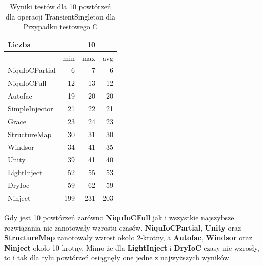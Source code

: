 \documentclass[12pt]{article}
\begin{document}
\begin{table}[H]
\captionsetup{belowskip=0pt,aboveskip=0pt}
\begin{center}
\begin{small}
	\begin{tabular}{ | l | r r r | }
    		\hline
Liczba & & 10 & \\ \hline
 & min & max & avg \\ \hline
NiquIoCPartial & 6 & 7 & 6 \\ \hline
NiquIoCFull & 12 & 13 & 12 \\ \hline
Autofac & 19 & 20 & 20 \\ \hline
SimpleInjector & 21 & 22 & 21 \\ \hline
Grace & 23 & 24 & 23 \\ \hline
StructureMap & 30 & 31 & 30 \\ \hline
Windsor & 34 & 41 & 35 \\ \hline
Unity & 39 & 41 & 40 \\ \hline
LightInject & 52 & 55 & 53 \\ \hline
DryIoc & 59 & 62 & 59 \\ \hline
Ninject & 199 & 231 & 203 \\ \hline
  	\end{tabular}
\end{small}
\end{center}
\caption{Wyniki testów dla 10 powtórzeń dla operacji TransientSingleton dla Przypadku testowego C}
\label{TestCaseC_TransientSingleton10}
\end{table}
Gdy jest 10 powtórzeń zarówno \textbf{NiquIoCFull} jak i wszystkie najszybsze rozwiązania nie zanotowały wzrostu czasów. \textbf{NiquIoCPartial}, \textbf{Unity} oraz \textbf{StructureMap} zanotowały wzrost około 2-krotny, a \textbf{Autofac}, \textbf{Windsor} oraz \textbf{Ninject} około 10-krotny. Mimo że dla \textbf{LightInject} i \textbf{DryIoC} czasy nie wzrosły, to i tak dla tylu powtórzeń osiągnęły one jedne z najwyższych wyników.
\\ \\
\end{document}
